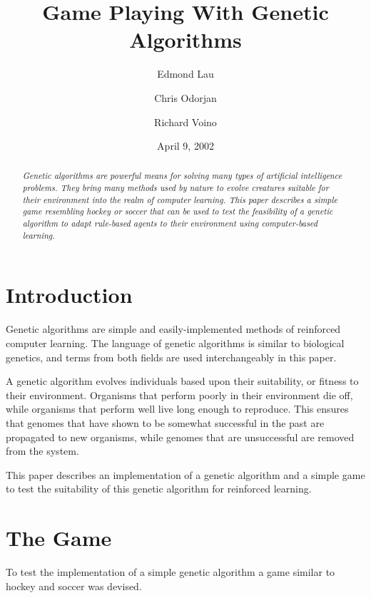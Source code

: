 \documentclass[%
        compressed,
        notitlepage,
        narroweqnarray,
        inline,
        ]{ieee}
\begin{document}
\title[Game Playing With Genetic Algorithms]{Game Playing With Genetic Algorithms}

\author[LAU, ODORJAN, VOINO]{
      Edmond Lau
    \and
      Chris Odorjan
    \and
      Richard Voino
  }

\date{April 9, 2002}

\maketitle               

\begin{abstract}
\it{
Genetic algorithms are powerful means for solving many types of artificial
intelligence problems. They bring many methods used by nature to evolve
creatures suitable for their environment into the realm of computer
learning. This paper describes a simple game resembling hockey or soccer
that can be used to test the feasibility of a genetic algorithm to adapt
rule-based agents to their environment using computer-based learning.
}
\end{abstract}

\section{Introduction}

\PARstart Genetic algorithms are simple and easily-implemented methods of
reinforced computer learning. The language of genetic algorithms is similar
to biological genetics, and terms from both fields are used interchangeably
in this paper.

A genetic algorithm evolves individuals based upon their suitability, or
fitness to their environment. Organisms that perform poorly in their
environment die off, while organisms that perform well live long enough to
reproduce. This ensures that genomes that have shown to be somewhat
successful in the past are propagated to new organisms, while genomes that
are unsuccessful are removed from the system.

This paper describes an implementation of a genetic algorithm and a simple
game to test the suitability of this genetic algorithm for reinforced
learning.

\section{The Game}

To test the implementation of a simple genetic algorithm a game similar to
hockey and soccer was devised.
\end{document}
